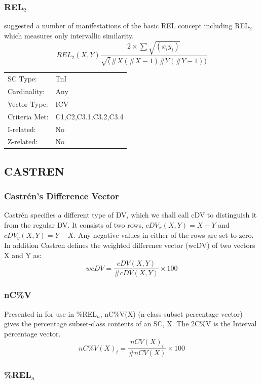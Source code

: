 \documentclass{article}
\begin{document}
\subsubsection{REL$_{2}$}
\label{sec-11-8-2}

\citet{Rahn1979} suggested a number of manifestations of the basic REL
concept including REL$_{2}$ which measures only intervallic similarity.
$$ REL_{2}(X,Y)\frac{2\times\sum\sqrt{(x_{i}y_{i})}}{\sqrt(\#X(\#X-1)\#Y(\#Y-1))} $$

\begin{center}
\begin{tabular}{ll}
 SC Type:       &  TnI                   \\
 Cardinality:   &  Any                   \\
 Vector Type:   &  ICV                   \\
 Criteria Met:  &  C1,C2,C3.1,C3.2,C3.4  \\
 I-related:     &  No                    \\
 Z-related:     &  No                    \\
\end{tabular}
\end{center}
\subsection{CASTREN}
\label{sec-11-9}
\subsubsection{Castrén's Difference Vector}
\label{sec-11-9-1}

Castrén specifies a different type of DV, which we shall call cDV to
distinguish it from the regular DV. It consists of two rows,
$cDV_{x}(X,Y)=X-Y$ and $cDV_{y}(X,Y)=Y-X$. Any negative values in
either of the rows are set to zero.  In addition Castren defines the
weighted difference vector (wcDV) of two vectors X and Y as:
$$wcDV=\frac{cDV(X,Y)}{\#cDV(X,Y)}\times 100$$
\subsubsection{nC\%V}
\label{sec-11-9-2}

Presented in \citet{Castren1994} for use in \%REL$_{n}$, nC\%V(X) (n-class
subset percentage vector) gives the percentage subset-class contents
of an SC, X. The 2C\%V is the Interval percentage vector.
$$nC\%V(X)_{i}=\frac{nCV(X)_{i}}{\#nCV(X)}\times 100$$
\subsubsection{\%REL$_{n}$}
\label{sec-11-9-3}
\end{document}
